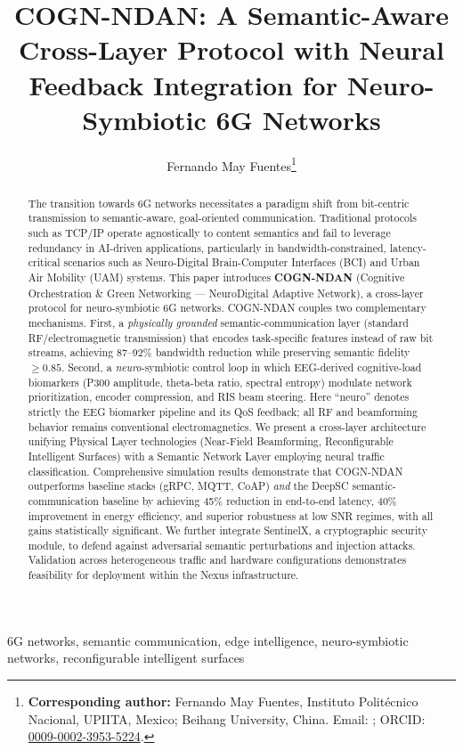 \documentclass{BVP_CINC}
\newcommand{\COGN}{COGN-NDAN}
\begin{document}
\title{COGN-NDAN: A Semantic-Aware Cross-Layer Protocol with Neural Feedback Integration for Neuro-Symbiotic 6G Networks}
\author{Fernando May Fuentes\thanks{\textbf{Corresponding author:} Fernando May Fuentes, Instituto Politécnico Nacional, UPIITA, Mexico; Beihang University, China. Email: ; ORCID: \href{https://orcid.org/0009-0002-3953-5224}{0009-0002-3953-5224}.}}
\begin{abstract}
The transition towards 6G networks necessitates a paradigm shift from bit-centric transmission to semantic-aware, goal-oriented communication. Traditional protocols such as TCP/IP operate agnostically to content semantics and fail to leverage redundancy in AI-driven applications, particularly in bandwidth-constrained, latency-critical scenarios such as Neuro-Digital Brain-Computer Interfaces (BCI) and Urban Air Mobility (UAM) systems. This paper introduces \textbf{COGN-NDAN} (Cognitive Orchestration \& Green Networking --- NeuroDigital Adaptive Network), a cross-layer protocol for neuro-symbiotic 6G networks. \COGN{} couples two complementary mechanisms. First, a \emph{physically grounded} semantic-communication layer (standard RF/electromagnetic transmission) that encodes task-specific features instead of raw bit streams, achieving 87--92\% bandwidth reduction while preserving semantic fidelity $\geq 0.85$. Second, a \emph{neuro}-symbiotic control loop in which EEG-derived cognitive-load biomarkers (P300 amplitude, theta-beta ratio, spectral entropy) modulate network prioritization, encoder compression, and RIS beam steering. Here ``neuro'' denotes strictly the EEG biomarker pipeline and its QoS feedback; all RF and beamforming behavior remains conventional electromagnetics. We present a cross-layer architecture unifying Physical Layer technologies (Near-Field Beamforming, Reconfigurable Intelligent Surfaces) with a Semantic Network Layer employing neural traffic classification. Comprehensive simulation results demonstrate that \COGN{} outperforms baseline stacks (gRPC, MQTT, CoAP) \emph{and} the DeepSC semantic-communication baseline by achieving 45\% reduction in end-to-end latency, 40\% improvement in energy efficiency, and superior robustness at low SNR regimes, with all gains statistically significant. We further integrate SentinelX, a cryptographic security module, to defend against adversarial semantic perturbations and injection attacks. Validation across heterogeneous traffic and hardware configurations demonstrates feasibility for deployment within the Nexus infrastructure.
\end{abstract}
\begin{keywords}
6G networks, semantic communication, edge intelligence, neuro-symbiotic networks, reconfigurable intelligent surfaces
\end{keywords}
\maketitle
\end{document}
